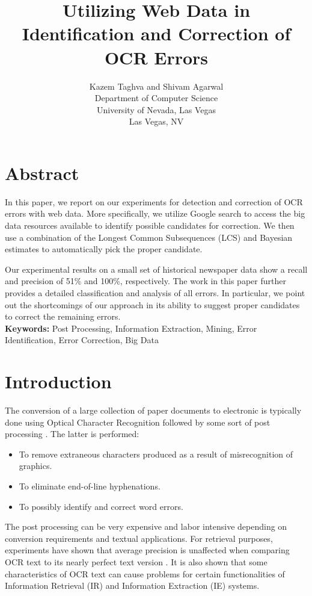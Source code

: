 \documentclass{article}
\title{ Utilizing Web Data in Identification and Correction of OCR Errors}
\author{Kazem Taghva and Shivam Agarwal\\
Department of Computer Science\\
University of Nevada, Las Vegas\\
Las Vegas, NV }
\date{} %
\begin{document}
\maketitle

\section{Abstract}

In this paper, we report on our experiments for detection and
correction of OCR errors with web data. More specifically, we utilize
Google search to access the big data resources available to identify
possible candidates for correction. We then use a combination of the
Longest Common Subsequences (LCS) and Bayesian estimates to
automatically pick the proper candidate.

Our experimental results on a small set of historical newspaper data
show a recall and precision of 51\% and 100\%, respectively. The work in
this paper further provides a detailed classification and analysis of
all errors. In particular, we point out the shortcomings of our
approach in its ability to suggest proper candidates to correct the
remaining errors.\\


{\bf Keywords:} Post Processing, Information Extraction, Mining, Error
Identification, Error Correction, Big Data

\section{Introduction}
\label{sec:introduction}

The conversion of a large collection of paper documents to electronic is
typically done using Optical Character Recognition followed by some
sort of post processing \cite{Taghva2006}. The latter is performed:
\begin{itemize}

\item To remove extraneous characters produced as a result of
  misrecognition of graphics.\\
\item To eliminate end-of-line hyphenations.\\
\item To possibly identify and correct word errors.

\end{itemize}

The post processing can be very expensive and labor intensive
depending on conversion requirements and textual applications. For
retrieval purposes, experiments have shown that average precision is
unaffected when comparing OCR text to its nearly perfect text version
\cite{Taghva96}.  It is also shown that some characteristics of OCR
text can cause problems for certain functionalities of Information
Retrieval (IR) and Information Extraction (IE)
systems\cite{Taghva2006}.
\end{document}
